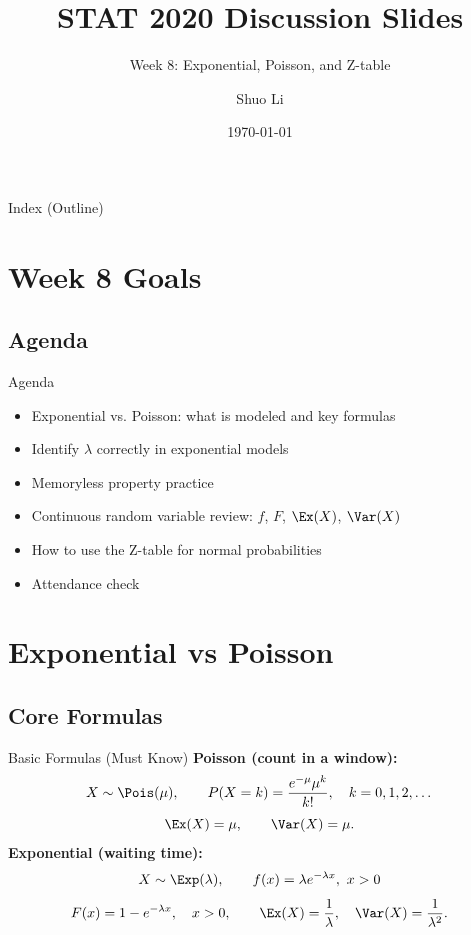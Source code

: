 \documentclass[aspectratio=169]{beamer}
\title[STAT 2020 Week 8 \hfill \insertframenumber/\inserttotalframenumber]{STAT 2020 Discussion Slides}
\subtitle{Week 8: Exponential, Poisson, and Z-table}
\author{Shuo Li}
\institute{University of Iowa}
\date{\today}
\begin{document}
\begin{frame}
  \titlepage
\end{frame}

\begin{frame}{Index (Outline)}
  \tableofcontents[hideallsubsections]
\end{frame}

\section{Week 8 Goals}

\subsection{Agenda}
\begin{frame}{Agenda}
  \begin{itemize}
    \item Exponential vs. Poisson: what is modeled and key formulas
    \item Identify \(\lambda\) correctly in exponential models
    \item Memoryless property practice
    \item Continuous random variable review: \(f\), \(F\), \(\Ex(X)\), \(\Var(X)\)
    \item How to use the Z-table for normal probabilities
    \item Attendance check
  \end{itemize}
\end{frame}

\section{Exponential vs Poisson}

\subsection{Core Formulas}
\begin{frame}{Basic Formulas (Must Know)}
  \textbf{Poisson (count in a window):}
  \[
    X\sim\Pois(\mu),\qquad P(X=k)=\frac{e^{-\mu}\mu^k}{k!},\quad k=0,1,2,\dots
  \]
  \[
    \Ex(X)=\mu,\qquad \Var(X)=\mu.
  \]
  \vspace{2mm}
  \textbf{Exponential (waiting time):}
  \[
    X\sim\Exp(\lambda),\qquad f(x)=\lambda e^{-\lambda x},\ x>0
  \]
  \[
    F(x)=1-e^{-\lambda x},\quad x>0,\qquad
    \Ex(X)=\frac{1}{\lambda},\quad \Var(X)=\frac{1}{\lambda^2}.
  \]
\end{frame}
\end{document}
